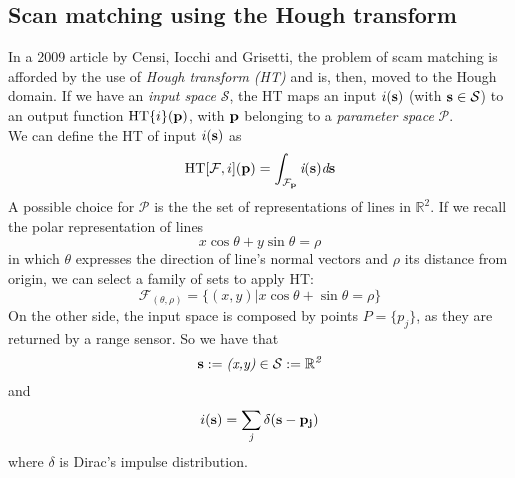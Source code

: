 \documentclass[a4paper, onecolumn]{report}
\begin{document}
\subsection{Scan matching using the Hough transform}
In a 2009 article by Censi, Iocchi and Grisetti, the problem of scam matching is afforded by the use of \emph{Hough transform (HT)} and is, then, moved to the Hough domain. If we have an \emph{input space} $\mathcal{S}$, the HT maps an input $i(\bf{s})$ (with $\bf{s} \in \mathcal{S}$) to an output function $\mbox{HT}\{i\}(\bf{p})$, with $\bf{p}$ belonging to a \emph{parameter space} $\mathcal{P}$. \\
We can define the HT of input $i(\bf{s})$ as
\begin{equation}
	\mbox{HT}[\mathcal{F}, i](\bf{p}) = \int_{\mathcal{F}_{\bf{p}}} \emph{i}(\bf{s}) \emph{d}\bf{s}
\end{equation}
A possible choice for $\mathcal{P}$ is the the set of representations of lines in $\mathbb{R}^2$. If we recall the polar representation of lines 
\begin{equation}
	x\cos\theta + y\sin\theta = \rho
\end{equation}
in which $\theta$ expresses the direction of line's normal vectors and $\rho$ its distance from origin, we can select a family of sets to apply HT:
\begin{equation}
	\mathcal{F}_{(\theta, \rho)} =\{(x,y) | x\cos\theta + \sin\theta = \rho\}
\end{equation}
On the other side, the input space is composed by points $P = \{p_j\}$, as they are returned by a range sensor. So we have that
\begin{equation}
	\bf{s} := \emph{(x,y)} \in \mathcal{S} := \mathbb{R}^\emph{2}
\end{equation}
and
\begin{equation}
	i(\bf{s}) = \sum_{\emph{j}} \delta(\bf{s} - \bf{p_j})
\end{equation}
where $\delta$ is Dirac's impulse distribution.
\end{document}
